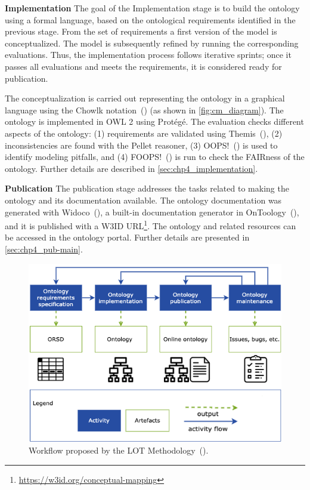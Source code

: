 \noindent\textbf{Implementation}
The goal of the Implementation stage is to build the ontology using a formal language, based on the ontological requirements identified in the previous stage. From the set of requirements a first version of the model is conceptualized. The model is subsequently refined by running the corresponding evaluations. Thus, the implementation process follows iterative sprints; once it passes all evaluations and meets the requirements, it is considered ready for publication.

The conceptualization is carried out representing the ontology in a graphical language using the  Chowlk notation~(\cite{feria2022chowlk}) (as shown in \cref{fig:cm_diagram}). The ontology is implemented in OWL 2 using Protégé. The evaluation checks different aspects of the ontology: (1)  requirements are validated using  Themis~(\cite{fernandez2021themis}), (2)  inconsistencies are found with the Pellet reasoner, (3)  OOPS!~(\cite{poveda2014oops}) is used to identify modeling pitfalls, and (4) FOOPS!~(\cite{garijo2021foops}) is run to check the FAIRness of the ontology. Further details are described in \cref{sec:chp4_implementation}.

\noindent\textbf{Publication}
The publication stage addresses the tasks related to making the ontology and its documentation available. The ontology documentation was generated with Widoco~(\cite{garijo2017widoco}), a built-in documentation generator in OnToology~(\cite{alobaid2019automating}), and it is published with a W3ID URL\footnote{\label{foot:cmlink}\url{https://w3id.org/conceptual-mapping}}. The ontology and related resources can be accessed in the ontology portal. Further details are presented in \cref{sec:chp4_pub-main}.

\begin{figure}[!t]
\centering
\includegraphics[width=0.6\linewidth]{figures/lot.png}
\caption{Workflow proposed by the LOT Methodology~(\cite{poveda2022lot}).}
\label{fig:lot}
\end{figure}

